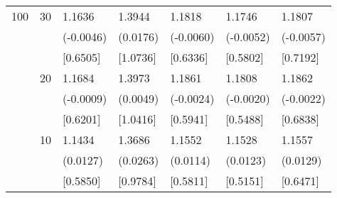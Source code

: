 \begin{table}[H]
{\begin{tabular}{c c | C{2.4cm} | C{2.4cm} | C{2.4cm} | C{2.4cm} | C{2.4cm} }
			100&30&1.1636&1.3944&1.1818&1.1746&1.1807\\
			&&(-0.0046)&(0.0176)&(-0.0060)&(-0.0052)&(-0.0057)\\
			&&[0.6505]&[1.0736]&[0.6336]&[0.5802]&[0.7192]\\
			&20&1.1684&1.3973&1.1861&1.1808&1.1862\\
			&&(-0.0009)&(0.0049)&(-0.0024)&(-0.0020)&(-0.0022)\\
			&&[0.6201]&[1.0416]&[0.5941]&[0.5488]&[0.6838]\\
			&10&1.1434&1.3686&1.1552&1.1528&1.1557\\
			&&(0.0127)&(0.0263)&(0.0114)&(0.0123)&(0.0129)\\
			&&[0.5850]&[0.9784]&[0.5811]&[0.5151]&[0.6471]\\
			\bottomrule[1.5pt]
	\end{tabular}}
	\label{table:table S.1}
\end{table}

